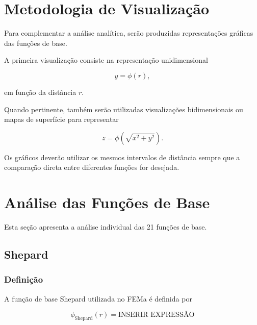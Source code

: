 \documentclass[12pt,a4paper]{article}
\begin{document}
	\section{Metodologia de Visualização}
	
	Para complementar a análise analítica, serão produzidas representações
	gráficas das funções de base.
	
	A primeira visualização consiste na representação unidimensional
	
	\begin{equation}
		y=\phi(r),
	\end{equation}
	
	em função da distância $r$.
	
	Quando pertinente, também serão utilizadas visualizações bidimensionais
	ou mapas de superfície para representar
	
	\begin{equation}
		z=\phi\left(
		\sqrt{x^2+y^2}
		\right).
	\end{equation}
	
	Os gráficos deverão utilizar os mesmos intervalos de distância sempre
	que a comparação direta entre diferentes funções for desejada.
	
	
	\section{Análise das Funções de Base}
	
	Esta seção apresenta a análise individual das 21 funções de base.
	
	
	\subsection{Shepard}
	
	\subsubsection{Definição}
	
	A função de base Shepard utilizada no FEMa é definida por
	
	\begin{equation}
		\phi_{\mathrm{Shepard}}(r)
		=
		\boxed{\text{INSERIR EXPRESSÃO}}
	\end{equation}
	
\end{document}

